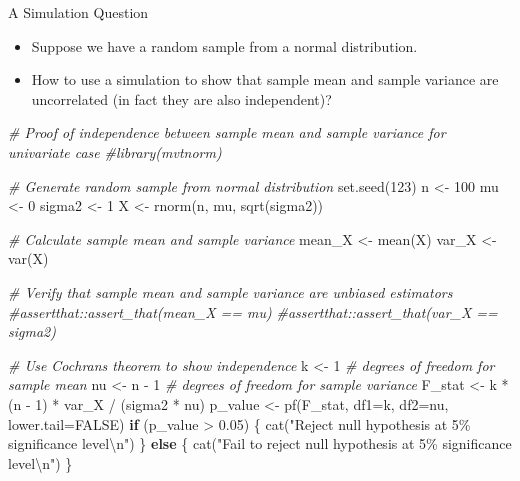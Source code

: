 \documentclass[
  ignorenonframetext,
]{beamer}
\newenvironment{Shaded}{\begin{snugshade}}{\end{snugshade}}
\newcommand{\AttributeTok}[1]{\textcolor[rgb]{0.77,0.63,0.00}{#1}}
\newcommand{\CommentTok}[1]{\textcolor[rgb]{0.56,0.35,0.01}{\textit{#1}}}
\newcommand{\ConstantTok}[1]{\textcolor[rgb]{0.00,0.00,0.00}{#1}}
\newcommand{\ControlFlowTok}[1]{\textcolor[rgb]{0.13,0.29,0.53}{\textbf{#1}}}
\newcommand{\DecValTok}[1]{\textcolor[rgb]{0.00,0.00,0.81}{#1}}
\newcommand{\FloatTok}[1]{\textcolor[rgb]{0.00,0.00,0.81}{#1}}
\newcommand{\FunctionTok}[1]{\textcolor[rgb]{0.00,0.00,0.00}{#1}}
\newcommand{\NormalTok}[1]{#1}
\newcommand{\OtherTok}[1]{\textcolor[rgb]{0.56,0.35,0.01}{#1}}
\newcommand{\SpecialCharTok}[1]{\textcolor[rgb]{0.00,0.00,0.00}{#1}}
\newcommand{\StringTok}[1]{\textcolor[rgb]{0.31,0.60,0.02}{#1}}
\providecommand{\tightlist}{%
  \setlength{\itemsep}{0pt}\setlength{\parskip}{0pt}}
\begin{document}
\begin{frame}[fragile]{A Simulation Question}
\protect\hypertarget{a-simulation-question}{}
\begin{itemize}
\tightlist
\item
  Suppose we have a random sample from a normal distribution.
\item
  How to use a simulation to show that sample mean and sample variance
  are uncorrelated (in fact they are also independent)?
\end{itemize}

\begin{Shaded}
\begin{Highlighting}[]
\CommentTok{\# Proof of independence between sample mean and sample variance for univariate case}
\CommentTok{\#library(mvtnorm)}

\CommentTok{\# Generate random sample from normal distribution}
\FunctionTok{set.seed}\NormalTok{(}\DecValTok{123}\NormalTok{)}
\NormalTok{n }\OtherTok{\textless{}{-}} \DecValTok{100}
\NormalTok{mu }\OtherTok{\textless{}{-}} \DecValTok{0}
\NormalTok{sigma2 }\OtherTok{\textless{}{-}} \DecValTok{1}
\NormalTok{X }\OtherTok{\textless{}{-}} \FunctionTok{rnorm}\NormalTok{(n, mu, }\FunctionTok{sqrt}\NormalTok{(sigma2))}

\CommentTok{\# Calculate sample mean and sample variance}
\NormalTok{mean\_X }\OtherTok{\textless{}{-}} \FunctionTok{mean}\NormalTok{(X)}
\NormalTok{var\_X }\OtherTok{\textless{}{-}} \FunctionTok{var}\NormalTok{(X)}

\CommentTok{\# Verify that sample mean and sample variance are unbiased estimators}
\CommentTok{\#assertthat::assert\_that(mean\_X == mu)}
\CommentTok{\#assertthat::assert\_that(var\_X == sigma2)}

\CommentTok{\# Use Cochran\textquotesingle{}s theorem to show independence}
\NormalTok{k }\OtherTok{\textless{}{-}} \DecValTok{1} \CommentTok{\# degrees of freedom for sample mean}
\NormalTok{nu }\OtherTok{\textless{}{-}}\NormalTok{ n }\SpecialCharTok{{-}} \DecValTok{1} \CommentTok{\# degrees of freedom for sample variance}
\NormalTok{F\_stat }\OtherTok{\textless{}{-}}\NormalTok{ k }\SpecialCharTok{*}\NormalTok{ (n }\SpecialCharTok{{-}} \DecValTok{1}\NormalTok{) }\SpecialCharTok{*}\NormalTok{ var\_X }\SpecialCharTok{/}\NormalTok{ (sigma2 }\SpecialCharTok{*}\NormalTok{ nu)}
\NormalTok{p\_value }\OtherTok{\textless{}{-}} \FunctionTok{pf}\NormalTok{(F\_stat, }\AttributeTok{df1=}\NormalTok{k, }\AttributeTok{df2=}\NormalTok{nu, }\AttributeTok{lower.tail=}\ConstantTok{FALSE}\NormalTok{)}
\ControlFlowTok{if}\NormalTok{ (p\_value }\SpecialCharTok{\textgreater{}} \FloatTok{0.05}\NormalTok{) \{}
  \FunctionTok{cat}\NormalTok{(}\StringTok{"Reject null hypothesis at 5\% significance level}\SpecialCharTok{\textbackslash{}n}\StringTok{"}\NormalTok{)}
\NormalTok{\} }\ControlFlowTok{else}\NormalTok{ \{}
  \FunctionTok{cat}\NormalTok{(}\StringTok{"Fail to reject null hypothesis at 5\% significance level}\SpecialCharTok{\textbackslash{}n}\StringTok{"}\NormalTok{)}
\NormalTok{\}}
\end{Highlighting}
\end{Shaded}
\end{frame}
\end{document}
